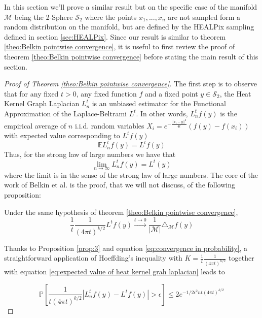 In this section we'll prove a similar result but on the specific case of the manifold $\mathcal M$ being the 2-Sphere $\mathcal S_2$ where the points $x_1, ..., x_n$ are not sampled form a random distribution on the manifold, but are defined by the HEALPix sampling defined in section \ref{sec:HEALPix}. Since our result is similar to theorem \ref{theo:Belkin pointwise convergence}, it is useful to first review the proof of theorem \ref{theo:Belkin pointwise convergence} before stating the main result of this section.
\begin{proof}[Proof of Theorem \ref{theo:Belkin pointwise convergence}]
The first step is to observe that for any fixed $t>0$, any fixed function $f$ and a fixed point $y\in\mathcal S_2$,  the Heat Kernel Graph Laplacian $L_n^t$ is an unbiased estimator for the Functional Approximation of the Laplace-Beltrami $L^t$. In other words, $L_n^tf(y)$ is the empirical average of $n$ i.i.d. random variables $X_i= e^{-\frac{||x_i-y||^2}{4t}}\left(f(y)-f(x_i)\right)$ with expected value corresponding to $L^tf(y)$
\begin{equation}
\label{eq:expected value of heat kernel grah laplacian}
	\mathbb E L_n^tf(y) = L^tf(y)
\end{equation}
Thus, for the strong law of large numbers we have that
\begin{equation}
\label{eq:convergence in probability}
\lim_{n\to\infty}L_n^tf(y) = L^t(y)
\end{equation}
where the limit is in the sense of the strong law of large numbers.
The core of the work of Belkin et al. is the proof, that we will not discuss, of the following proposition:

\begin{prop} Under the same hypothesis of theorem \ref{theo:Belkin pointwise convergence},
	$$\frac{1}{t}\frac{1}{(4\pi t)^{k/2}} L^tf(y) \xrightarrow{t\to 0 } \frac{1}{|\mathcal M|}\triangle_{\mathcal M}f(y)$$
	\label{prop:3}
\end{prop}

Thanks to Proposition \ref{prop:3} and equation \ref{eq:convergence in probability}, a straightforward application of Hoeffding's inequality with $K=\frac{1}{t}\frac{1}{(4\pi t)^{k/2}}$ together with equation  \ref{eq:expected value of heat kernel grah laplacian} leads to

\begin{equation}
	\label{eq:hoeffding applied}
	\mathbb{P}\left[\frac{1}{t(4 \pi t)^{k / 2}}\left|L_{n}^{t} f(y)- L^{t} f(y)\right|>\epsilon\right] \leq 2 e^{-1 / 2 \epsilon^{2} n t(4 \pi t)^{k / 2}}
\end{equation}


\end{proof}
